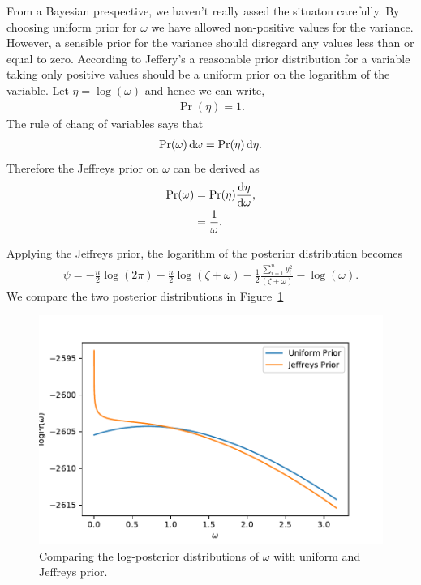 \documentclass[11pt,twoside,a4paper]{article}
\begin{document}
  From a Bayesian prespective, we haven't really assed the situaton carefully.
  By choosing uniform prior for $\omega$ we have allowed non-positive values
  for the variance. However, a sensible prior for the variance should disregard
  any values less than or equal to zero. According to Jeffery's a reasonable
  prior distribution for a variable taking only positive values should be
  a uniform prior on the logarithm of the variable. Let $\eta = \log(\omega)$
  and hence we can write,
  \begin{align}
    \Pr(\eta) = 1.
  \end{align}
  The rule of chang of variables says that
  \begin{align}
    \Pr(\omega) \dif \omega = \Pr(\eta) \dif \eta.
  \end{align}
  Therefore the Jeffreys prior on $\omega$ can be derived as
  \begin{align}
    \Pr(\omega) &= \Pr(\eta) \frac {\dif \eta}{\dif \omega}, \\
    &= \frac{1}{\omega}.
  \end{align}

  Applying the Jeffreys prior, the logarithm of the posterior distribution
  becomes
  \begin{align}
    \psi  = - \frac{n}{2} \log (2 \pi) - \frac{n}{2} \log (\zeta + \omega)
      - \frac{1}{2} \frac{\sum_{i=1}^n y_i^2}{(\zeta + \omega)} - \log(\omega).
  \end{align}
  We compare the two posterior distributions in
  Figure~\ref{fig_log_post_uniform_jeffreys}
  \begin{figure}
    \includegraphics[scale=0.8]{images/log_post_uniform_jeffreys.pdf}
    \caption{Comparing the log-posterior distributions of $\omega$ with uniform and Jeffreys prior.}
    \label{fig_log_post_uniform_jeffreys}
  \end{figure}
\end{document}
